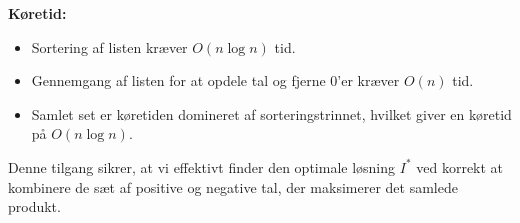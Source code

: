 \documentclass{article}
\begin{document}
\textbf{Køretid:}
\begin{itemize}
    \item Sortering af listen kræver $O(n \log n)$ tid.
    \item Gennemgang af listen for at opdele tal og fjerne $0$’er kræver $O(n)$ tid.
    \item Samlet set er køretiden domineret af sorteringstrinnet, hvilket giver en køretid på $O(n \log n)$.
\end{itemize}

Denne tilgang sikrer, at vi effektivt finder den optimale løsning $I^*$ ved korrekt at kombinere de sæt af positive og negative tal, der maksimerer det samlede produkt.
\end{document}
